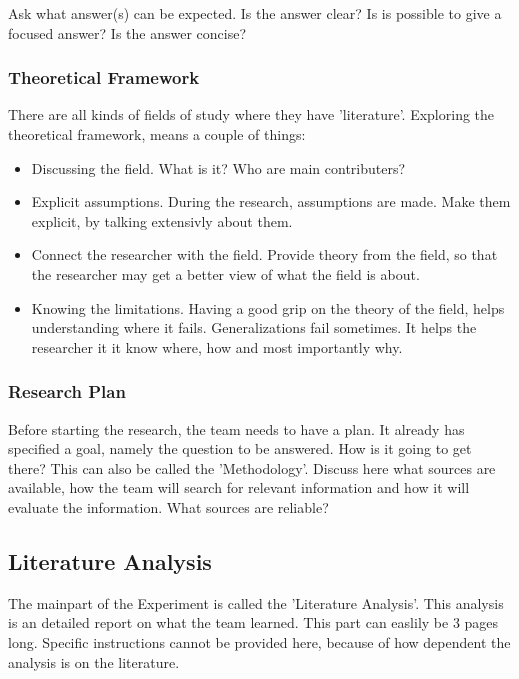 \documentclass[10pt]{report}
\begin{document}
\noindent Ask what answer(s) can be expected. Is the answer clear? Is is possible to give a focused answer? Is the answer concise?

\subsubsection{Theoretical Framework}

There are all kinds of fields of study where they have 'literature'. Exploring the theoretical framework, means a couple of things:

\begin{itemize}
	\item Discussing the field. What is it? Who are main contributers?
	\item Explicit assumptions. During the research, assumptions are made. Make them explicit, by talking extensivly about them.
	\item Connect the researcher with the field. Provide theory from the field, so that the researcher may get a better view of what the field is about.
	\item Knowing the limitations. Having a good grip on the theory of the field, helps understanding where it fails. Generalizations fail sometimes. It helps the researcher it it know where, how and most importantly why.
\end{itemize}

\subsubsection{Research Plan}

Before starting the research, the team needs to have a plan. It already has specified a goal, namely the question to be answered. How is it going to get there? This can also be called the 'Methodology'. Discuss here what sources are available, how the team will search for relevant information and how it will evaluate the information. What sources are reliable?

\subsection{Literature Analysis}

The mainpart of the Experiment is called the 'Literature Analysis'. This analysis is an detailed report on what the team learned. This part can easlily be 3 pages long. Specific instructions cannot be provided here, because of how dependent the analysis is on the literature.
\end{document}
